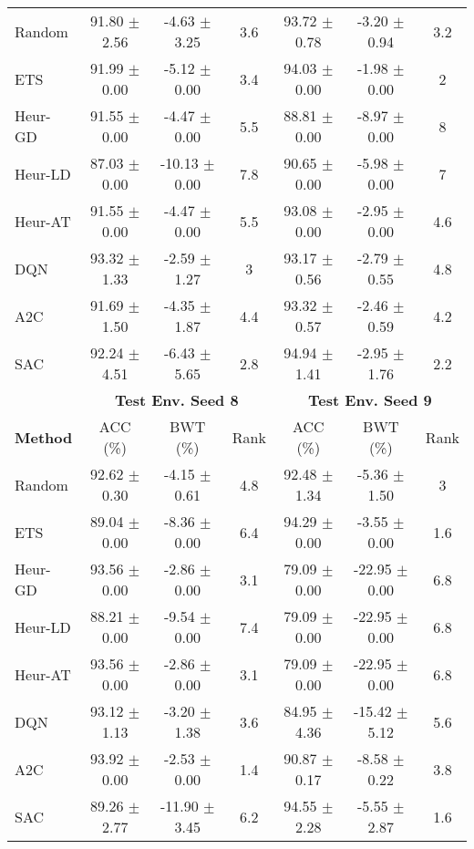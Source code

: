 \begin{tabular}{lcccccc}
	\midrule 
	Random          & 91.80 $\pm$ 2.56   & -4.63 $\pm$ 3.25    & 3.6    & 93.72 $\pm$ 0.78   & -3.20 $\pm$ 0.94    & 3.2    \\
	ETS             & 91.99 $\pm$ 0.00   & -5.12 $\pm$ 0.00    & 3.4    & 94.03 $\pm$ 0.00   & -1.98 $\pm$ 0.00    & 2      \\
	Heur-GD         & 91.55 $\pm$ 0.00   & -4.47 $\pm$ 0.00    & 5.5    & 88.81 $\pm$ 0.00   & -8.97 $\pm$ 0.00    & 8      \\
	Heur-LD         & 87.03 $\pm$ 0.00   & -10.13 $\pm$ 0.00   & 7.8    & 90.65 $\pm$ 0.00   & -5.98 $\pm$ 0.00    & 7      \\
	Heur-AT         & 91.55 $\pm$ 0.00   & -4.47 $\pm$ 0.00    & 5.5    & 93.08 $\pm$ 0.00   & -2.95 $\pm$ 0.00    & 4.6    \\
	DQN             & 93.32 $\pm$ 1.33   & -2.59 $\pm$ 1.27    & 3      & 93.17 $\pm$ 0.56   & -2.79 $\pm$ 0.55    & 4.8    \\
	A2C             & 91.69 $\pm$ 1.50   & -4.35 $\pm$ 1.87    & 4.4    & 93.32 $\pm$ 0.57   & -2.46 $\pm$ 0.59    & 4.2    \\
	SAC             & 92.24 $\pm$ 4.51   & -6.43 $\pm$ 5.65    & 2.8    & 94.94 $\pm$ 1.41   & -2.95 $\pm$ 1.76    & 2.2    \\
	\midrule 
	& \multicolumn{3}{c}{\textbf{Test Env. Seed 8}} & \multicolumn{3}{c}{\textbf{Test Env. Seed 9}} \\
	\cmidrule(lr){2-4} \cmidrule(lr){5-7}
	\textbf{Method} & ACC (\%)         & BWT (\%)          & Rank   & ACC (\%)         & BWT (\%)          & Rank   \\
	\midrule 
	Random          & 92.62 $\pm$ 0.30   & -4.15 $\pm$ 0.61    & 4.8    & 92.48 $\pm$ 1.34   & -5.36 $\pm$ 1.50    & 3      \\
	ETS             & 89.04 $\pm$ 0.00   & -8.36 $\pm$ 0.00    & 6.4    & 94.29 $\pm$ 0.00   & -3.55 $\pm$ 0.00    & 1.6    \\
	Heur-GD         & 93.56 $\pm$ 0.00   & -2.86 $\pm$ 0.00    & 3.1    & 79.09 $\pm$ 0.00   & -22.95 $\pm$ 0.00   & 6.8    \\
	Heur-LD         & 88.21 $\pm$ 0.00   & -9.54 $\pm$ 0.00    & 7.4    & 79.09 $\pm$ 0.00   & -22.95 $\pm$ 0.00   & 6.8    \\
	Heur-AT         & 93.56 $\pm$ 0.00   & -2.86 $\pm$ 0.00    & 3.1    & 79.09 $\pm$ 0.00   & -22.95 $\pm$ 0.00   & 6.8    \\
	DQN             & 93.12 $\pm$ 1.13   & -3.20 $\pm$ 1.38    & 3.6    & 84.95 $\pm$ 4.36   & -15.42 $\pm$ 5.12   & 5.6    \\
	A2C             & 93.92 $\pm$ 0.00   & -2.53 $\pm$ 0.00    & 1.4    & 90.87 $\pm$ 0.17   & -8.58 $\pm$ 0.22    & 3.8    \\
	SAC             & 89.26 $\pm$ 2.77   & -11.90 $\pm$ 3.45   & 6.2    & 94.55 $\pm$ 2.28   & -5.55 $\pm$ 2.87    & 1.6   \\
	\bottomrule 
\end{tabular}